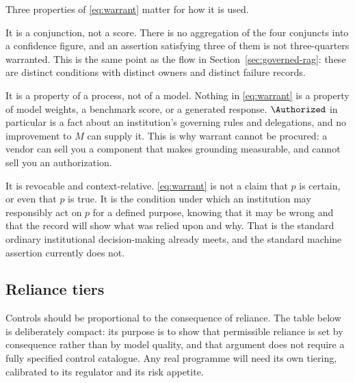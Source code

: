 Three properties of \eqref{eq:warrant} matter for how it is used.

It is a conjunction, not a score. There is no aggregation of the four conjuncts into
a confidence figure, and an assertion satisfying three of them is not
three-quarters warranted. This is the same point as the flow in
Section~\ref{sec:governed-rag}: these are distinct conditions with distinct owners
and distinct failure records.

It is a property of a process, not of a model. Nothing in \eqref{eq:warrant} is a
property of model weights, a benchmark score, or a generated response.
$\Authorized$ in particular is a fact about an institution's governing rules and
delegations, and no improvement to $M$ can supply it. This is why warrant cannot be
procured: a vendor can sell you a component that makes grounding measurable, and
cannot sell you an authorization.

It is revocable and context-relative. \eqref{eq:warrant} is not a claim that $p$ is
certain, or even that $p$ is true. It is the condition under which an institution
may responsibly act on $p$ for a defined purpose, knowing that it may be wrong and
that the record will show what was relied upon and why. That is the standard
ordinary institutional decision-making already meets, and the standard machine
assertion currently does not.

\subsection{Reliance tiers}

Controls should be proportional to the consequence of reliance. The table below is
deliberately compact: its purpose is to show that permissible reliance is set by
consequence rather than by model quality, and that argument does not require a
fully specified control catalogue. Any real programme will need its own tiering,
calibrated to its regulator and its risk appetite.

